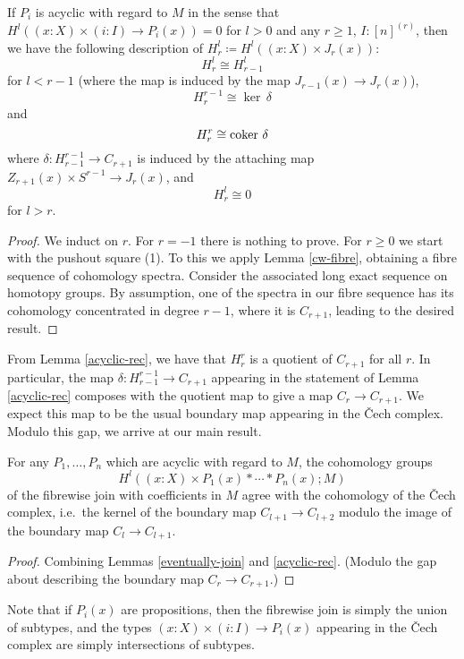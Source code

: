 \begin{lemma}\label{acyclic-rec}
If $P_i$ is acyclic with regard to $M$ in the sense that
$H^l((x : X) \times (i : I) \to P_i(x)) = 0$ for $l > 0$ and any
$r \ge 1$, $I : [n]^{(r)}$, then we have the following description of
$H^l_r \coloneqq H^l((x: X) \times J_r(x))$:
\[H^l_r \cong H^l_{r-1}\]
for $l < r-1$ (where the map is induced by the map $J_{r-1}(x) \to J_r(x)$),
	\[H^{r-1}_r \cong \ker\,\delta\]
	and
	\[H^r_r \cong \operatorname{coker}\,\delta\]
	where $\delta : H^{r-1}_{r-1} \to C_{r+1}$
	is induced by the attaching map $Z_{r+1}(x) \times S^{r-1} \to J_r(x)$,
	and
\[H^l_r \cong 0\]
for $l > r$.
\end{lemma}
\begin{proof}
We induct on $r$. For $r = -1$ there is nothing to prove. For $r \ge 0$ we start with
the pushout square (1). %
To this we apply Lemma \ref{cw-fibre}, obtaining
a fibre sequence of cohomology spectra. Consider the associated long exact sequence
on homotopy groups. By assumption, one of the spectra in our fibre sequence has
its cohomology concentrated in degree $r-1$, where it is
$C_{r+1}$, leading to the desired result.
\end{proof}
From Lemma \ref{acyclic-rec}, we have that $H^r_r$ is a quotient of $C_{r+1}$
for all $r$. In particular, the map $\delta : H^{r-1}_{r-1} \to C_{r+1}$ appearing in the statement of Lemma \ref{acyclic-rec}
composes with the quotient map to give a map $C_r \to C_{r+1}$.
We expect this map to be the usual boundary map appearing in the \v{C}ech complex.
Modulo this gap, we arrive at our main result.
\begin{theorem}
For any $P_1,\ldots,P_n$ which are acyclic with regard to $M$, the cohomology groups 
\[
H^l((x: X) \times P_1(x) * \cdots * P_n(x); M)
\]
of the fibrewise join with coefficients in $M$ agree with the cohomology of the \v{C}ech complex,
i.e.\ the kernel of the boundary map $C_{l+1} \to C_{l+2}$ modulo the image of the boundary
map $C_l \to C_{l+1}$.
\end{theorem}
\begin{proof}
Combining Lemmas \ref{eventually-join} and \ref{acyclic-rec}. (Modulo the gap about describing
		the boundary map $C_r \to C_{r+1}$.)
\end{proof}
Note that if $P_i(x)$ are propositions, then the fibrewise join
is simply the union of subtypes, and the types 
$(x : X) \times (i: I) \to P_i(x)$ appearing in the \v{C}ech complex
are simply intersections of subtypes.
